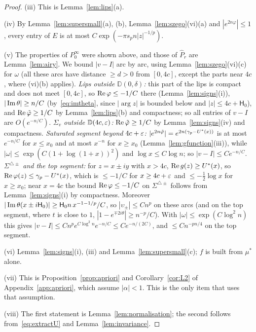 \begin{proof}
(iii) This is Lemma~\ref{lem:lips}(a).

(iv) By Lemma~\ref{lem:supersmall}(a), (b), Lemma~\ref{lem:szego}(vi)(a) and $|e^{2n\varphi}|\le1$, every entry of $E$
is at most $C\exp(-\pi s_pn|z|^{-1/p})$.

(v) The properties of $P^\infty_0$ were shown above, and those of $\hat P_r$ are Lemma~\ref{lem:airy}. We bound
$|v-I|$ arc by arc, using Lemma~\ref{lem:szego}(vi)(c) for $\omega$ (all these arcs have distance $\ge d>0$ from
$[0,4c]$, except the parts near $4c$, where (vi)(b) applies).
\emph{Lips outside $\mathbb D(0,\delta)$:} this part of the lips is compact and does not meet $[0,4c]$, so $\operatorname{Re}\varphi\le-1/C$
there (Lemma~\ref{lem:signs}(i)), $|\operatorname{Im}\theta|\ge n/C$ (by~\eqref{eq:imtheta}, since $|\arg z|$ is bounded below and
$|z|\le4c+\mathsf H_0$), and $\operatorname{Re}\tilde\varphi\ge1/C$ by Lemma~\ref{lem:lips}(b) and compactness; so all entries of $v-I$ are
$O(e^{-n/C})$.
\emph{$\Sigma_v$ outside $\mathbb D(4c,\varepsilon)$:} $\operatorname{Re}\tilde\varphi\ge1/C$ by Lemma~\ref{lem:signs}(iv) and compactness.
\emph{Saturated segment beyond $4c+\varepsilon$:} $|e^{2n\tilde\varphi}|=e^{2n(\gamma_p-U^*(x))}$ is at most $e^{-n/C}$ for $x\le x_0$
and at most $x^{-n}$ for $x\ge x_0$ (Lemma~\ref{lem:gfunction}(iii)), while $|\omega|\le\exp(C(1+\log(1+x))^2)$ and
$\log x\le C\log n$; so $|v-I|\le Ce^{-n/C}$.
\emph{$\Sigma^{\triangle\pm}$ and the top segment:} for $z=x\pm iy$ with $x>4c$, $\operatorname{Re} g(z)\ge U^*(x)$, so
$\operatorname{Re}\varphi(z)\le\gamma_p-U^*(x)$, which is $\le-1/C$ for $x\ge4c+\varepsilon$ and $\le-\frac12\log x$ for $x\ge x_0$; near
$x=4c$ the bound $\operatorname{Re}\varphi\le-1/C$ on $\Sigma^{\triangle\pm}$ follows from Lemma~\ref{lem:signs}(i) by compactness.
Moreover $|\operatorname{Im}\theta(x\pm i\mathsf H_0)|\ge \mathsf H_0n\,x^{-1-1/p}/C$, so $|\upsilon_\pm|\le Cn^p$ on these arcs (and on the top
segment, where $t$ is close to $1$, $|1-e^{\mp2i\theta}|\ge n^{-p}/C$). With $|\omega|\le\exp(C\log^2n)$ this gives
$|v-I|\le Cn^pe^{C\log^2n}e^{-n/C}\le Ce^{-n/(2C)}$, and $\le Cn^{-pn/4}$ on the top segment.

(vi) Lemma~\ref{lem:signs}(i), (iii) and Lemma~\ref{lem:supersmall}(c); $f$ is built from $\mu^*$ alone.

(vii) This is Proposition~\ref{prop:apriori} and Corollary~\ref{cor:L2} of Appendix~\ref{app:apriori}, which assume
$|\alpha|<1$. This is the only item that uses that assumption.

(viii) The first statement is Lemma~\ref{lem:normalisation}; the second follows from~\eqref{eq:extractU} and
Lemma~\ref{lem:invariance}.
\end{proof}
